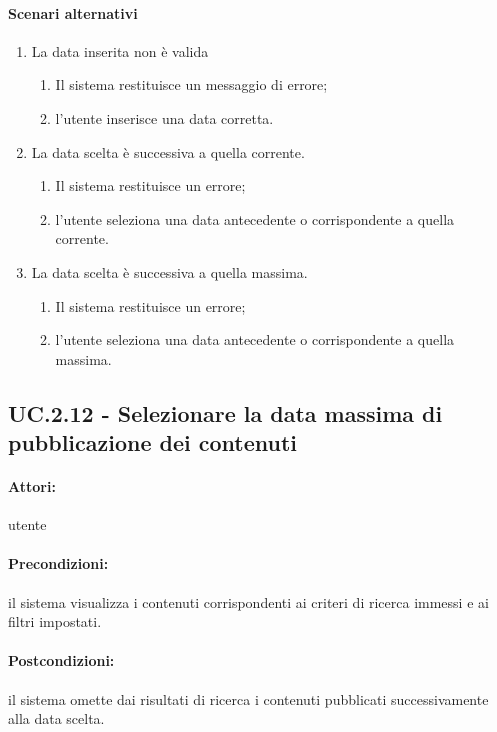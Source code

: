 \documentclass[10pt,a4paper,headinclude,footinclude,hidelinks]{scrreprt} %
\begin{document}
	\paragraph{Scenari alternativi}
	\begin{enumerate}
	\item La data inserita non è valida
		\begin{enumerate}
		\item Il sistema restituisce un messaggio di errore;
		\item l'utente inserisce una data corretta.
		\end{enumerate}
	\item La data scelta è successiva a quella corrente.
		\begin{enumerate}
		\item Il sistema restituisce un errore;
		\item l'utente seleziona una data antecedente o corrispondente a quella corrente.
		\end{enumerate}
	\item La data scelta è successiva a quella massima.
		\begin{enumerate}
		\item Il sistema restituisce un errore;
		\item l'utente seleziona una data antecedente o corrispondente a quella massima.
		\end{enumerate}
	\end{enumerate}

	\subsection[UC.2.12]{UC.2.12 - Selezionare la data massima di pubblicazione dei contenuti}
	\label{ch:stage:ar:uc:2_12}
	\paragraph{Attori:} utente
	\paragraph{Precondizioni:} il sistema visualizza i contenuti corrispondenti ai criteri di ricerca immessi e ai filtri impostati.
	\paragraph{Postcondizioni:} il sistema omette dai risultati di ricerca i contenuti pubblicati successivamente alla data scelta.
\end{document}
